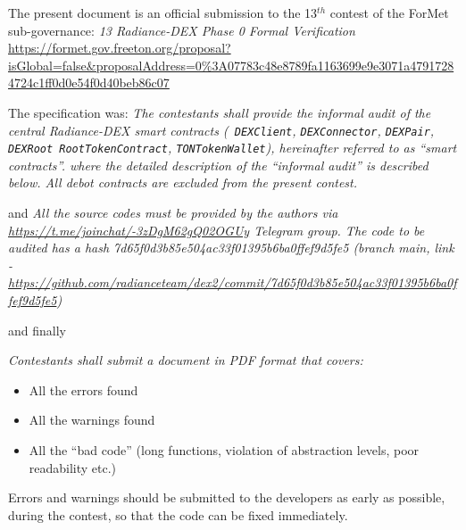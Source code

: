 
The present document is an official submission to the 13$^{th}$
contest of the ForMet sub-governance: {\em 13 Radiance-DEX Phase 0
  Formal Verification}
\url{https://formet.gov.freeton.org/proposal?isGlobal=false&proposalAddress=0%3A07783c48e8789fa1163699e9e3071a47917284724c1ff0d0e54f0d40beb86c07}

  The specification was: {\em The contestants shall provide the
    informal audit of the central Radiance-DEX smart contracts ({\tt
      DEXClient}, {\tt DEXConnector}, {\tt DEXPair}, {\tt DEXRoot
      RootTokenContract}, {\tt TONTokenWallet}), hereinafter referred
    to as ``smart contracts''.  where the detailed description of the
    ``informal audit'' is described below. All debot contracts are
    excluded from the present contest.  }

  and {\em All the source codes must be provided by the authors via
    \url{https://t.me/joinchat/-3zDgM62gQ02OGUy} Telegram group. The code to
    be audited has a hash 7d65f0d3b85e504ac33f01395b6ba0ffef9d5fe5
    (branch main, link -
    \url{https://github.com/radianceteam/dex2/commit/7d65f0d3b85e504ac33f01395b6ba0ffef9d5fe5})
  }

  and finally {\em
Contestants shall submit a document in PDF format that covers:
\begin{itemize}
  \item All the errors found
  \item All the warnings found
  \item All the ``bad code'' (long functions, violation of abstraction levels, poor readability etc.)    
\end{itemize}

Errors and warnings should be submitted to the developers as early as
possible, during the contest, so that the code can be fixed
immediately.  }
